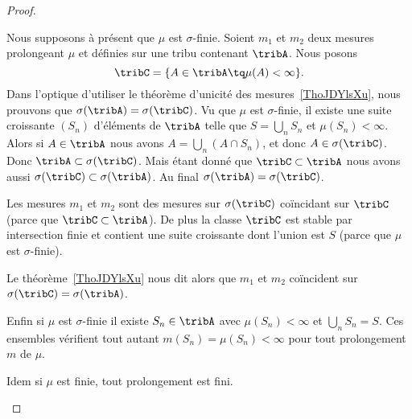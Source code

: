 \begin{proof}
	\begin{subproof}
		\spitem[Unicité]

		Nous supposons à présent que \( \mu\) est \( \sigma\)-finie. Soient \( m_1\) et \( m_2\) deux mesures prolongeant \( \mu\) et définies sur une tribu contenant \( \tribA\). Nous posons
		\begin{equation}
			\tribC=\{ A\in\tribA\tq\mu(A)<\infty \}.
		\end{equation}
		Dans l'optique d'utiliser le théorème d'unicité des mesures~\ref{ThoJDYlsXu}, nous prouvons que \( \sigma(\tribA)=\sigma(\tribC)\). Vu que \( \mu\) est \( \sigma\)-finie, il existe une suite croissante \( (S_n)\) d'éléments de \( \tribA\) telle que \( S=\bigcup_nS_n\) et \( \mu(S_n)<\infty\). Alors si \( A\in\tribA\) nous avons \( A=\bigcup_n(A\cap S_n)\), et donc \( A\in\sigma(\tribC)\). Donc \( \tribA\subset\sigma(\tribC)\). Mais étant donné que \( \tribC\subset\tribA\) nous avons aussi \( \sigma(\tribC)\subset\sigma(\tribA)\). Au final \( \sigma(\tribA)=\sigma(\tribC)\).

		Les mesures \( m_1\) et \( m_2\) sont des mesures sur \( \sigma(\tribC)\) coïncidant sur \( \tribC\) (parce que \( \tribC\subset\tribA\)). De plus la classe \( \tribC\) est stable par intersection finie et contient une suite croissante dont l'union est \( S\) (parce que \( \mu\) est \( \sigma\)-finie).

		Le théorème~\ref{ThoJDYlsXu} nous dit alors que \( m_1\) et \( m_2\) coïncident sur \( \sigma(\tribC)=\sigma(\tribA)\).


		Enfin si \( \mu\) est \( \sigma\)-finie il existe \( S_n\in\tribA\) avec \( \mu(S_n)<\infty\) et \( \bigcup_nS_n=S\). Ces ensembles vérifient tout autant \( m(S_n)=\mu(S_n)<\infty\) pour tout prolongement \( m\) de \( \mu\).

		Idem si \( \mu\) est finie, tout prolongement est fini.
	\end{subproof}
\end{proof}

